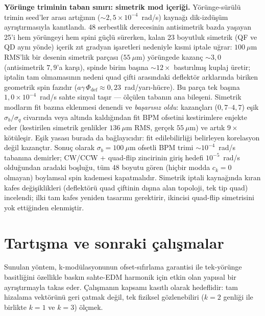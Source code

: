 \documentclass[preprint,12pt]{elsarticle}
\begin{document}
\textbf{Yörünge triminin taban sınırı: simetrik mod içeriği.}
Yörünge-sürülü trimin seed'ler arası artığının ($\sim2{,}5\times
10^{-4}$~rad/s) kaynağı dik-izdüşüm ayrıştırmasıyla kanıtlandı.
48 serbestlik derecesinin antisimetrik bazda yaşayan 25'i hem
yörüngeyi hem spini güçlü sürerken, kalan 23 boyutluk simetrik
(QF ve QD aynı yönde) içerik zıt gradyan işaretleri nedeniyle kısmi
iptale uğrar: $100~\mu$m RMS'lik bir desenin simetrik parçası
($55~\mu$m) yörüngede kazanç $\sim3{,}0$ (antisimetrik $7{,}9$'a
karşı), spinde birim ba\c{s}ına $\sim12\times$ bastırılmış kuplaj
üretir; iptalin tam olmamasının nedeni quad çifti arasındaki
deflektör arklarında biriken geometrik spin fazıdır
($a\gamma\,\Phi_\mathrm{def}\approx0{,}23$~rad/yarı-hücre). Bu parça
tek başına $1{,}0\times10^{-4}$~rad/s sahte sinyal taşır — ölçülen
tabanın ana bileşeni. Simetrik modların fit bazına eklenmesi denendi
ve \emph{başarısız oldu}: kazançları ($0{,}7$--$4{,}7$) eşik
$\sigma_b/\sigma_q$ civarında veya altında kaldığından fit BPM
ofsetini kestirimlere enjekte eder (kestirilen simetrik genlikler
$136~\mu$m RMS, gerçek $55~\mu$m) ve artık $9\times$ kötüleşir.
Eşik yasası burada da bağlayıcıdır: fit edilebilirliği belirleyen
korelasyon değil kazançtır. Sonuç olarak $\sigma_b=100~\mu$m
ofsetli BPM trimi $\sim10^{-4}$~rad/s tabanına demirler;
CW/CCW + quad-flip zincirinin giri\c{s} hedefi $10^{-5}$~rad/s
olduğundan aradaki boşluğu, tüm 48 boyutu gören (hiçbir modda
$c_k=0$ olmayan) boylamsal spin kademesi kapatmalıdır. Simetrik
iptali kaynağında kıran kafes değişiklikleri (deflektörü quad
çiftinin dışına alan topoloji, tek tip quad) incelendi; ilki tam
kafes yeniden tasarımı gerektirir, ikincisi quad-flip simetrisini
yok ettiğinden elenmiştir.

\section{Tartışma ve sonraki çalışmalar}
\label{sec:tartisma}

Sunulan yöntem, k-modülasyonunun ofset-sıfırlama garantisi ile tek-yörünge
basitliğini özellikle baskın sahte-EDM harmonik için etkin olan yapısal
bir ayrıştırmayla takas eder. Çalışmanın kapsamı kasıtlı olarak hedeflidir:
tam hizalama vektörünü geri çatmak değil, tek fiziksel gözlenebiliri
($k=2$ genliği ile birlikte $k=1$ ve $k=3$) ölçmek.
\end{document}
